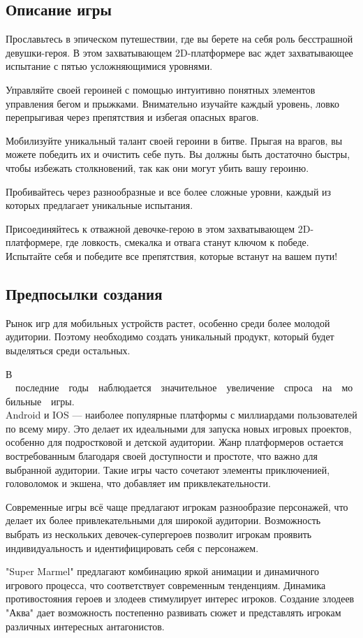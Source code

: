 \documentclass[article,12pt, fleqn]{article}
\begin{document}
\begin{itemize}
\subsection{Описание игры}
Прославьтесь в эпическом путешествии, где вы берете на себя роль бесстрашной девушки-героя. В этом захватывающем 2D-платформере вас ждет захватывающее испытание с пятью усложняющимися уровнями.\par
Управляйте своей героиней с помощью интуитивно понятных элементов управления бегом и прыжками. Внимательно изучайте каждый уровень, ловко перепрыгивая через препятствия и избегая опасных врагов. \par
Мобилизуйте уникальный талант своей героини в битве. Прыгая на врагов, вы можете победить их и очистить себе путь. Вы должны быть достаточно быстры, чтобы избежать столкновений, так как они могут убить вашу героиню.\par
Пробивайтесь через разнообразные и все более сложные уровни, каждый из которых предлагает уникальные испытания. \par
Присоединяйтесь к отважной девочке-герою в этом захватывающем 2D-платформере, где ловкость, смекалка и отвага станут ключом к победе. Испытайте себя и победите все препятствия, которые встанут на вашем пути!

\subsection{Предпосылки создания}
Рынок игр для мобильных устройств растет, особенно среди более молодой аудитории. Поэтому необходимо создать уникальный продукт, который будет выделяться среди остальных.\par 
В \ \ последние\ \ годы\ \ наблюдается\ \ значительное\ \ увеличение\ \ спроса\ \ на\ \ мобильные\ \ игры. \\ Android и IOS --- наиболее популярные платформы с миллиардами пользователей по всему миру. Это делает их идеальными для запуска новых игровых проектов, особенно для подростковой и детской аудитории. Жанр платформеров остается востребованным благодаря своей доступности и простоте, что важно для выбранной аудитории. Такие игры часто
сочетают элементы приключенией, головоломок и экшена, что добавляет им приквлекательности. \par
Современные игры всё чаще предлагают игрокам разнообразие персонажей, что делает их более привлекательными для широкой аудитории. Возможность выбрать из нескольких девочек-супергероев позволит игрокам проявить индивидуальность и идентифицировать себя с персонажем. \par
"Super Marmel" предлагают комбинацию яркой анимации и динамичного игрового процесса, что соответствует современным тенденциям. Динамика противостояния героев и злодеев стимулирует интерес игроков. Создание злодеев "Аква" дает возможность постепенно развивать сюжет и представлять игрокам различных интересных антагонистов.


\end{itemize}
\end{document}

